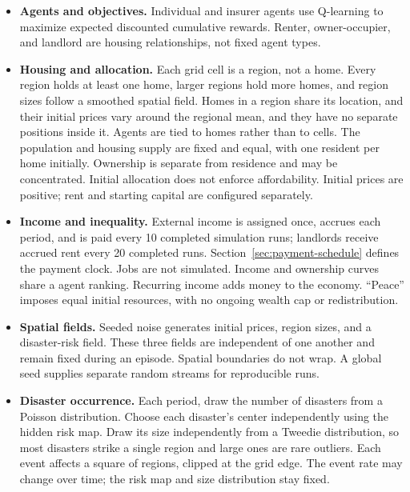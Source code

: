 \documentclass[10pt]{article}
\makeatletter
\renewcommand\section{\@startsection{section}{1}{\z@}{-1.6ex plus -.4ex}{.7ex}{\normalfont\large\bfseries}}
\makeatother
\begin{document}
\section{Model assumptions}
\label{sec:assumptions}

\begin{itemize}
\item \textbf{Agents and objectives.} Individual and insurer agents use Q-learning to maximize expected discounted cumulative rewards. Renter, owner-occupier, and landlord are housing relationships, not fixed agent types.
\item \textbf{Housing and allocation.} Each grid cell is a region, not a home. Every region holds at least one home, larger regions hold more homes, and region sizes follow a smoothed spatial field. Homes in a region share its location, and their initial prices vary around the regional mean, and they have no separate positions inside it. Agents are tied to homes rather than to cells. The population and housing supply are fixed and equal, with one resident per home initially. Ownership is separate from residence and may be concentrated. Initial allocation does not enforce affordability. Initial prices are positive; rent and starting capital are configured separately.
\item \textbf{Income and inequality.} External income is assigned once, accrues each period, and is paid every 10 completed simulation runs; landlords receive accrued rent every 20 completed runs. Section~\ref{sec:payment-schedule} defines the payment clock. Jobs are not simulated. Income and ownership curves share a agent ranking. Recurring income adds money to the economy. ``Peace'' imposes equal initial resources, with no ongoing wealth cap or redistribution.
\item \textbf{Spatial fields.} Seeded noise generates initial prices, region sizes, and a disaster-risk field. These three fields are independent of one another and remain fixed during an episode. Spatial boundaries do not wrap. A global seed supplies separate random streams for reproducible runs.
\item \textbf{Disaster occurrence.} Each period, draw the number of disasters from a Poisson distribution. Choose each disaster's center independently using the hidden risk map. Draw its size independently from a Tweedie distribution, so most disasters strike a single region and large ones are rare outliers. Each event affects a square of regions, clipped at the grid edge. The event rate may change over time; the risk map and size distribution stay fixed.

\end{itemize}
\end{document}
